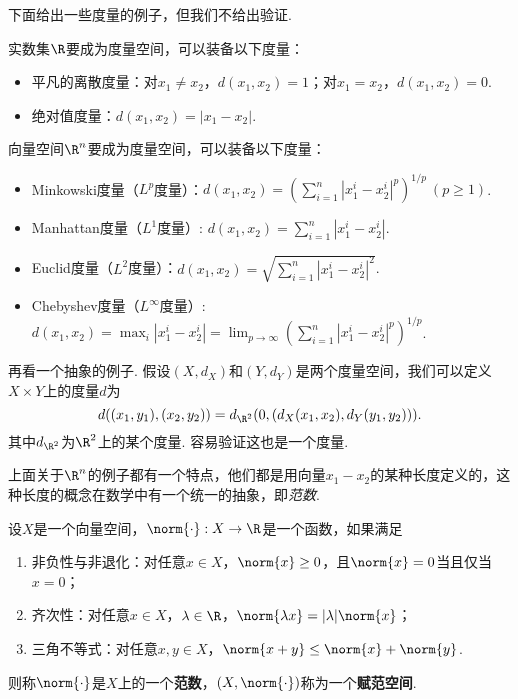 下面给出一些度量的例子，但我们不给出验证. 
\begin{example}\label{ex:metric}
    实数集$\R$要成为度量空间，可以装备以下度量：
    \begin{itemize}
            \item 平凡的离散度量：对$x_1\neq x_2$，$d(x_1,x_2)=1$；对$x_1=x_2$，$d(x_1,x_2)=0$. 
            \item 绝对值度量：$d(x_1,x_2)=|x_1-x_2|$. 
        \end{itemize}

        向量空间$\R^n$要成为度量空间，可以装备以下度量：
        \begin{itemize}
            \item Minkowski度量（$L^p$度量）：$d(x_1,x_2)=(\sum_{i=1}^n|x_1^i-x_2^i|^p)^{1/p}\ (p\geq 1)$. 
            \item Manhattan度量（$L^1$度量）: $d(x_1,x_2)=\sum_{i=1}^n|x_1^i-x_2^i|$. 
            \item Euclid度量（$L^2$度量）：$d(x_1,x_2)=\sqrt{\sum_{i=1}^n|x_1^i-x_2^i|^2}$. 
            \item Chebyshev度量（$L^\infty$度量）: $d(x_1,x_2)=\max_i|x_1^i-x_2^i|=\lim_{p\to\infty}(\sum_{i=1}^n|x_1^i-x_2^i|^p)^{1/p}$. 
        \end{itemize}

    再看一个抽象的例子. 假设$(X,d_X)$和$(Y,d_Y)$是两个度量空间，我们可以定义$X\times Y$上的度量$d$为
    \[d((x_1,y_1),(x_2,y_2))=d_{\R^2}(0,(d_X(x_1,x_2),d_Y(y_1,y_2))).\]
    其中$d_{\R^2}$为$\R^2$上的某个度量. 容易验证这也是一个度量. 
\end{example}

上面关于$\R^n$的例子都有一个特点，他们都是用向量$x_1-x_2$的某种长度定义的，这种长度的概念在数学中有一个统一的抽象，即\emph{范数}. 

\begin{definition}[范数，赋范空间]
设$X$是一个向量空间，$\norm{\cdot}:X\to\R$是一个函数，如果满足
\begin{enumerate}
    \item 非负性与非退化：对任意$x\in X$，$\norm{x}\geq 0$，且$\norm{x}=0$当且仅当$x=0$；
    \item 齐次性：对任意$x\in X$，$\lambda\in\R$，$\norm{\lambda x}=|\lambda|\norm{x}$；
    \item 三角不等式：对任意$x,y\in X$，$\norm{x+y}\leq \norm{x}+\norm{y}$. 
\end{enumerate}
则称$\norm{\cdot}$是$X$上的一个\textbf{范数}，$(X,\norm{\cdot})$称为一个\textbf{赋范空间}. 
\end{definition}

